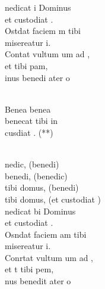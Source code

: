 \documentclass[12pt]{article}
\begin{document}
\begin{multicols*}{2}
\begin{cancion}[Benedicat][]%
	nedicat i Dominus \\
	et custodiat .\\
	Ostdat faciem m tibi\\
	 misereatur i.\\
	Contat vultum um ad ,\\
	et  tibi pam,\\
	inus benedi ater o \\\jump\\
	\begin{chorus}%
	Benea     benea \\
	benecat tibi in\\
	 cusdiat . (**)\\
	\end{chorus}%
	\jump\\
	nedic, (benedi)\\
	benedi, (benedic)\\
	tibi domus, (benedi)\\
	tibi domus, (et custodiat )\\
\jump
	nedicat bi Dominus\\
	et custodiat .\\
	Osndat faciem am tibi\\
	 misereatur i.\\
	Conrtat vultum um ad ,\\
	et t tibi pem,\\
	nus benedit ater o \\\jump\\
	\begin{chorus}%

\end{chorus}
\end{cancion}
\end{multicols*}
\end{document}
